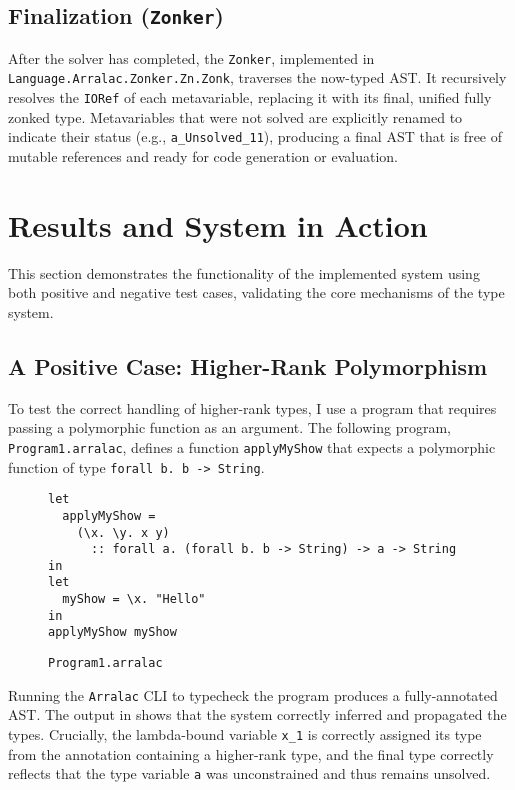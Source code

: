 \subsection{Finalization (\texttt{Zonker})}
After the solver has completed, the \texttt{Zonker}, implemented in \\ \texttt{Language.Arralac.Zonker.Zn.Zonk}, traverses the now-typed AST. It recursively resolves the \texttt{IORef} of each metavariable, replacing it with its final, unified fully zonked type. Metavariables that were not solved are explicitly renamed to indicate their status (e.g., \texttt{a\_Unsolved\_11}), producing a final AST that is free of mutable references and ready for code generation or evaluation.

\section{Results and System in Action}
\label{sec:Implementation:Results}

This section demonstrates the functionality of the implemented system using both positive and negative test cases, validating the core mechanisms of the type system.

\subsection{A Positive Case: Higher-Rank Polymorphism}
To test the correct handling of higher-rank types, I use a program that requires passing a polymorphic function as an argument. The following program, \texttt{Program1.arralac}, defines a function \texttt{applyMyShow} that expects a polymorphic function of type \texttt{forall b. b -> String}.

\begin{figure}
  \centering
  \begin{verbatim}
let
  applyMyShow =
    (\x. \y. x y)
      :: forall a. (forall b. b -> String) -> a -> String
in
let
  myShow = \x. "Hello"
in
applyMyShow myShow
\end{verbatim}
  \caption{\texttt{Program1.arralac}}
\end{figure}

Running the \texttt{Arralac} CLI to typecheck the program produces a fully-annotated AST. The output in  shows that the system correctly inferred and propagated the types. Crucially, the lambda-bound variable \texttt{x\_1} is correctly assigned its type from the annotation containing a higher-rank type, and the final type correctly reflects that the type variable \texttt{a} was unconstrained and thus remains unsolved.

